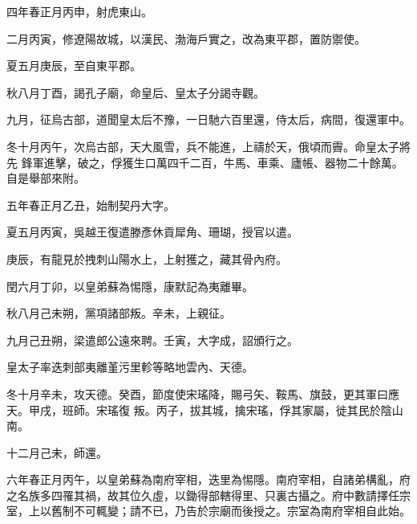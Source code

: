 
\begin{pinyinscope}

 四年春正月丙申，射虎東山。



 二月丙寅，修遼陽故城，以漢民、渤海戶實之，改為東平郡，置防禦使。



 夏五月庚辰，至自東平郡。



 秋八月丁酉，謁孔子廟，命皇后、皇太子分謁寺觀。



 九月，征烏古部，道聞皇太后不豫，一日馳六百里還，侍太后，病間，復還軍中。



 冬十月丙午，次烏古部，天大風雪，兵不能進，上禱於天，俄頃而霽。命皇太子將先
 鋒軍進擊，破之，俘獲生口萬四千二百，牛馬、車乘、廬帳、器物二十餘萬。自是舉部來附。



 五年春正月乙丑，始制契丹大字。



 夏五月丙寅，吳越王復遣滕彥休貢犀角、珊瑚，授官以遣。



 庚辰，有龍見於拽刺山陽水上，上射獲之，藏其骨內府。



 閏六月丁卯，以皇弟蘇為惕隱，康默記為夷離畢。



 秋八月己未朔，黨項諸部叛。辛未，上親征。



 九月己丑朔，梁遣郎公遠來聘。壬寅，大字成，詔頒行之。



 皇太子率迭刺部夷離堇污里軫等略地雲內、天德。



 冬十月辛未，攻天德。癸酉，節度使宋瑤降，賜弓矢、鞍馬、旗鼓，更其軍曰應天。甲戌，班師。宋瑤復
 叛。丙子，拔其城，擒宋瑤，俘其家屬，徙其民於陰山南。



 十二月己未，師還。



 六年春正月丙午，以皇弟蘇為南府宰相，迭里為惕隱。南府宰相，自諸弟構亂，府之名族多四罹其禍，故其位久虛，以鋤得部轄得里、只裏古攝之。府中數請擇任宗室，上以舊制不可輒變；請不已，乃告於宗廟而後授之。宗室為南府宰相自此始。




\end{pinyinscope}
